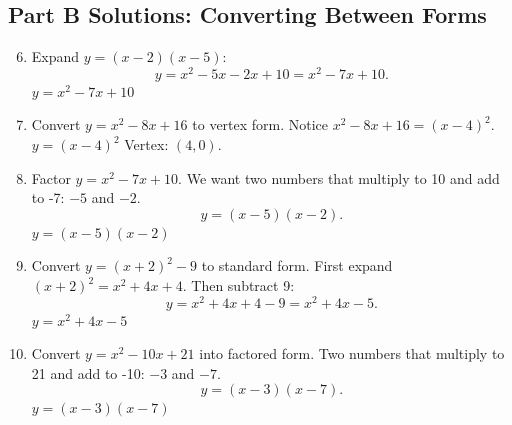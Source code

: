 \documentclass[14pt]{extarticle}
\begin{document}
\subsection*{Part B Solutions: Converting Between Forms}
\begin{enumerate}
  \setcounter{enumi}{5}
  \item Expand \(y = (x - 2)(x - 5)\):
  \[
  y = x^2 - 5x - 2x + 10 = x^2 - 7x + 10.
  \]
  \(\boxed{y = x^2 - 7x + 10}\)

  \item Convert \(y = x^2 - 8x + 16\) to vertex form.  
  Notice \(x^2 - 8x + 16 = (x - 4)^2.\)  
  \(\boxed{y = (x - 4)^2}\)  
  Vertex: \((4, 0)\).

  \item Factor \(y = x^2 - 7x + 10\).  
  We want two numbers that multiply to 10 and add to -7: \(-5\) and \(-2.\)  
  \[
  y = (x - 5)(x - 2).
  \]
  \(\boxed{y = (x - 5)(x - 2)}\)

  \item Convert \(y = (x + 2)^2 - 9\) to standard form.  
  First expand \((x + 2)^2 = x^2 + 4x + 4.\)  
  Then subtract 9:
  \[
  y = x^2 + 4x + 4 - 9 = x^2 + 4x - 5.
  \]
  \(\boxed{y = x^2 + 4x - 5}\)

  \item Convert \(y = x^2 - 10x + 21\) into factored form.  
  Two numbers that multiply to 21 and add to -10: \(-3\) and \(-7.\)  
  \[
  y = (x - 3)(x - 7).
  \]
  \(\boxed{y = (x - 3)(x - 7)}\)
\end{enumerate}
\end{document}
